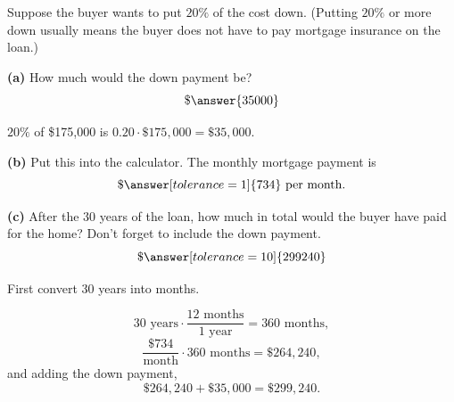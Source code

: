 \documentclass[12pt]{ximera}
\begin{document}
\begin{problem}
Suppose the buyer wants to put $20\%$ of the cost down. (Putting $20\%$ or more down
usually means the buyer does not have to pay mortgage insurance on the loan.)

\begin{prompt}
\textbf{(a)} How much would the down payment be?
\[
\$\answer{35000}
\]
\begin{solution}
$20\%$ of \$175,000 is $0.20 \cdot \$175{,}000 = \$35{,}000$.
\end{solution}
\end{prompt}

\begin{prompt}
\textbf{(b)} Put this into the calculator. The monthly mortgage payment is
\[
\$\answer[tolerance=1]{734} \text{ per month.}
\]
\end{prompt}

\begin{prompt}
\textbf{(c)} After the 30 years of the loan, how much in total would the buyer have
paid for the home? Don't forget to include the down payment.
\[
\$\answer[tolerance=10]{299240}
\]

\begin{hint}
First convert 30 years into months.
\end{hint}

\begin{solution}
\[
30 \text{ years} \cdot \frac{12 \text{ months}}{1 \text{ year}} = 360 \text{ months},
\]
\[
\frac{\$734}{\text{month}} \cdot 360 \text{ months} = \$264{,}240,
\]
and adding the down payment,
\[
\$264{,}240 + \$35{,}000 = \$299{,}240.
\]
\end{solution}
\end{prompt}
\end{problem}
\end{document}
